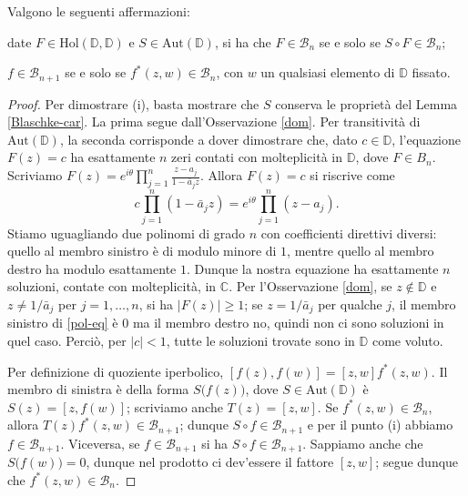 \begin{prop} \label{blaschke-prop}
  Valgono le seguenti affermazioni:
  \begin{nlist}
    \item date $F \in \text{Hol}(\mathbb{D},\mathbb{D})$ e $S \in \text{Aut}(\mathbb{D})$, si ha che $F \in \mathcal{B}_n$ se e solo se $S\circ F \in \mathcal{B}_n$;
    \item $f \in \mathcal{B}_{n+1}$ se e solo se $f^*(z,w) \in \mathcal{B}_n$, con $w$ un qualsiasi elemento di $\mathbb{D}$ fissato.
  \end{nlist}
\end{prop}

\begin{proof}
  Per dimostrare (i), basta mostrare che $S$ conserva le proprietà del Lemma \ref{Blaschke-car}. La prima segue dall'Osservazione \ref{dom}. Per transitività di $\text{Aut}(\mathbb{D})$, la seconda corrisponde a dover dimostrare che, dato $c \in \mathbb{D}$, l'equazione $F(z)=c$ ha esattamente $n$ zeri contati con molteplicità in $\mathbb{D}$, dove $F \in B_n$. Scriviamo $F(z)=\displaystyle e^{i\theta}\prod_{j=1}^n \frac{z-a_j}{1-\bar{a}_jz}$. Allora $F(z)=c$ si riscrive come
  \begin{equation} \label{pol-eq}
    c\prod_{j=1}^n (1-\bar{a}_jz)=e^{i\theta}\prod_{j=1}^n(z-a_j).
  \end{equation}
  Stiamo uguagliando due polinomi di grado $n$ con coefficienti direttivi diversi: quello al membro sinistro è di modulo minore di $1$, mentre quello al membro destro ha modulo esattamente $1$. Dunque la nostra equazione ha esattamente $n$ soluzioni, contate con molteplicità, in $\mathbb{C}$.
  Per l'Osservazione \ref{dom}, se $z \not\in \mathbb{D}$ e $z\not=1/\bar{a}_j$ per $j=1,\dots,n$, si ha $|F(z)| \ge 1$; se $z=1/\bar{a}_j$ per qualche $j$, il membro sinistro di \eqref{pol-eq} è $0$ ma il membro destro no, quindi non ci sono soluzioni in quel caso. Perciò, per $|c|<1$, tutte le soluzioni trovate sono in $\mathbb{D}$ come voluto.

  Per definizione di quoziente iperbolico, $[f(z),f(w)]=[z,w]f^*(z,w)$. Il membro di sinistra è della forma $S\bigl(f(z)\bigr)$, dove $S \in \text{Aut}(\mathbb{D})$ è $S(z)=[z,f(w)]$; scriviamo anche $T(z)=[z,w]$.
  Se $f^*(z,w) \in \mathcal{B}_n$, allora $T(z)f^*(z,w) \in \mathcal{B}_{n+1}$; dunque $S\circ f \in \mathcal{B}_{n+1}$ e per il punto (i) abbiamo $f \in \mathcal{B}_{n+1}$. Viceversa, se $f \in \mathcal{B}_{n+1}$ si ha $S\circ f \in \mathcal{B}_{n+1}$.
  Sappiamo anche che $S\bigl(f(w)\bigr)=0$, dunque nel prodotto ci dev'essere il fattore $[z,w]$; segue dunque che $f^*(z,w) \in \mathcal{B}_n$.
\end{proof}

